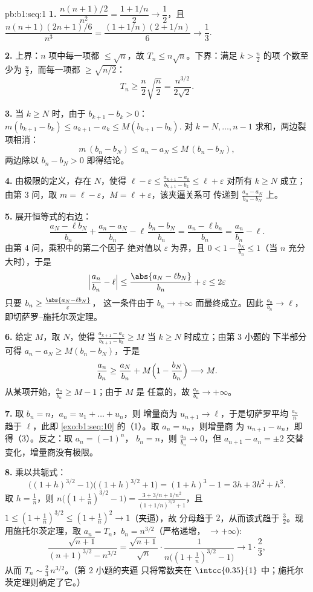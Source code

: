 \begin{solution}{pb:b1:seq:1}
\textbf{1.} $\dfrac{n(n+1)/2}{n^2} = \dfrac{1 + 1/n}{2} \to
\dfrac12$，且 $\dfrac{n(n+1)(2n+1)/6}{n^3} = \dfrac{(1 +
1/n)(2 + 1/n)}{6} \to \dfrac13$.

\textbf{2.} 上界：$n$ 项中每一项都 $\leq \sqrt n$，故
$T_n \leq n\sqrt n$。下界：满足 $k > \frac n2$ 的项
个数至少为 $\frac n2$，而每一项都 $\geq \sqrt{n/2}$：
\[
T_n \geq \frac n2 \sqrt{\frac n2} = \frac{n^{3/2}}{2\sqrt 2} .
\]

\textbf{3.} 当 $k \geq N$ 时，由于 $b_{k+1} - b_k > 0$：
$m(b_{k+1} - b_k) \leq a_{k+1} - a_k \leq M(b_{k+1} - b_k)$.
对 $k = N, \dots, n - 1$ 求和，两边裂项相消：
\[
m\,(b_n - b_N) \leq a_n - a_N \leq M\,(b_n - b_N),
\]
两边除以 $b_n - b_N > 0$ 即得结论。

\textbf{4.} 由极限的定义，存在 $N$，使得 $\ell -
\varepsilon \leq \frac{a_{k+1} - a_k}{b_{k+1} - b_k} \leq \ell +
\varepsilon$ 对所有 $k \geq N$ 成立；由第 3 问，取 $m = \ell -
\varepsilon$，$M = \ell + \varepsilon$，该夹逼关系可
传递到 $\frac{a_n - a_N}{b_n - b_N}$ 上。

\textbf{5.} 展开恒等式的右边：
\[
\frac{a_N - \ell b_N}{b_n} + \frac{a_n - a_N}{b_n} -
\ell\,\frac{b_n - b_N}{b_n}
= \frac{a_n - \ell b_n}{b_n} = \frac{a_n}{b_n} - \ell .
\]
由第 4 问，乘积中的第二个因子
绝对值以 $\varepsilon$ 为界，且 $0 < 1 - \frac{b_N}{b_n}
\leq 1$（当 $n$ 充分大时），于是
\[
\Bigl|\frac{a_n}{b_n} - \ell\Bigr|
\leq \frac{\abs{a_N - \ell b_N}}{b_n} + \varepsilon
\leq 2\varepsilon
\]
只要 $b_n \geq \frac{\abs{a_N - \ell b_N}}{\varepsilon}$，
这一条件由于 $b_n \to +\infty$ 而最终成立。因此
$\frac{a_n}{b_n} \to \ell$，即切萨罗--施托尔茨定理。

\textbf{6.} 给定 $M$，取 $N$，使得 $\frac{a_{k+1} -
a_k}{b_{k+1} - b_k} \geq M$ 当 $k \geq N$ 时成立；由第 3 小题的
下半部分可得 $a_n - a_N \geq M(b_n - b_N)$，于是
\[
\frac{a_n}{b_n} \geq \frac{a_N}{b_n} +
M\Bigl(1 - \frac{b_N}{b_n}\Bigr) \longrightarrow M .
\]
从某项开始，$\frac{a_n}{b_n} \geq M - 1$；由于 $M$ 是
任意的，故 $\frac{a_n}{b_n} \to +\infty$。

\textbf{7.} 取 $b_n = n$，$a_n = u_1 + \dots + u_n$，则
增量商为 $u_{n+1} \to \ell$，于是切萨罗平均
$\frac{a_n}{n}$ 趋于 $\ell$，此即
\cref{exo:b1:seq:10} 的（1）。取 $a_n = u_n$，则增量商
为 $u_{n+1} - u_n$，即得（3）。反之：取 $a_n = (-1)^n$，
$b_n = n$，则 $\frac{a_n}{b_n} \to 0$，但 $a_{n+1} - a_n = \pm
2$ 交替变化，增量商没有极限。

\textbf{8.} 乘以共轭式：
\[
\bigl((1+h)^{3/2} - 1\bigr)\bigl((1+h)^{3/2} + 1\bigr)
= (1+h)^3 - 1 = 3h + 3h^2 + h^3 .
\]
取 $h = \frac1n$，则 $n\bigl((1 + \frac1n)^{3/2} - 1\bigr) =
\frac{3 + 3/n + 1/n^2}{(1 + 1/n)^{3/2} + 1}$，且 $1 \leq (1 +
\frac1n)^{3/2} \leq (1 + \frac1n)^2 \to 1$（夹逼），故
分母趋于 $2$，从而该式趋于 $\frac32$。现
用施托尔茨定理，取 $a_n = T_n$，$b_n = n^{3/2}$（严格递增，
$\to +\infty$):
\[
\frac{\sqrt{n+1}}{(n+1)^{3/2} - n^{3/2}}
= \frac{\sqrt{n+1}}{\sqrt n} \cdot
\frac{1}{n\bigl((1 + \frac1n)^{3/2} - 1\bigr)}
\longrightarrow 1 \cdot \frac{2}{3},
\]
从而 $T_n \sim \frac23\,n^{3/2}$。（第 2 小题的夹逼
只将常数夹在 $\intcc{0.35}{1}$ 中；施托尔茨定理则确定了它。）


\end{solution}
